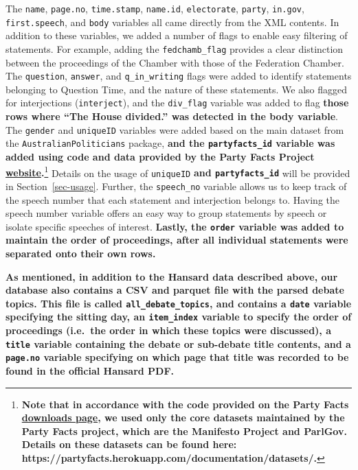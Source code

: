 \documentclass[
  letterpaper,
  DIV=11,
  numbers=noendperiod]{scrartcl}
\begin{document}
The \texttt{name}, \texttt{page.no}, \texttt{time.stamp},
\texttt{name.id}, \texttt{electorate}, \texttt{party}, \texttt{in.gov},
\texttt{first.speech}, and \texttt{body} variables all came directly
from the XML contents. In addition to these variables, we added a number
of flags to enable easy filtering of statements. For example, adding the
\texttt{fedchamb\_flag} provides a clear distinction between the
proceedings of the Chamber with those of the Federation Chamber. The
\texttt{question}, \texttt{answer}, and \texttt{q\_in\_writing} flags
were added to identify statements belonging to Question Time, and the
nature of these statements. We also flagged for interjections
(\texttt{interject}), and the \texttt{div\_flag} variable was added to
flag \textbf{those rows where ``The House divided.'' was detected in the
body variable}. The \texttt{gender} and \texttt{uniqueID} variables were
added based on the main dataset from the \texttt{AustralianPoliticians}
package, \textbf{and the \texttt{partyfacts\_id} variable was added
using code and data provided by the Party Facts Project
\href{https://partyfacts.herokuapp.com}{website}.}\footnote{\textbf{Note
  that in accordance with the code provided on the Party Facts
  \href{https://partyfacts.herokuapp.com/download/}{downloads page}, we
  used only the core datasets maintained by the Party Facts project,
  which are the Manifesto Project and ParlGov. Details on these datasets
  can be found here:
  https://partyfacts.herokuapp.com/documentation/datasets/.}} Details on
the usage of \texttt{uniqueID} \textbf{and \texttt{partyfacts\_id}} will
be provided in Section~\ref{sec-usage}. Further, the \texttt{speech\_no}
variable allows us to keep track of the speech number that each
statement and interjection belongs to. Having the speech number variable
offers an easy way to group statements by speech or isolate specific
speeches of interest. \textbf{Lastly, the \texttt{order} variable was
added to maintain the order of proceedings, after all individual
statements were separated onto their own rows.}

\textbf{As mentioned, in addition to the Hansard data described above,
our database also contains a CSV and parquet file with the parsed debate
topics. This file is called \texttt{all\_debate\_topics}, and contains a
\texttt{date} variable specifying the sitting day, an
\texttt{item\_index} variable to specify the order of proceedings
(i.e.~the order in which these topics were discussed), a \texttt{title}
variable containing the debate or sub-debate title contents, and a
\texttt{page.no} variable specifying on which page that title was
recorded to be found in the official Hansard PDF.}
\end{document}
